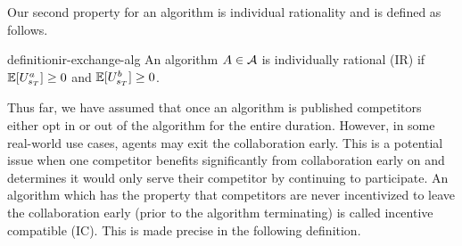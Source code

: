 
Our second property for an algorithm is individual rationality and is defined as follows.

\begin{restatable}{definition}{ir-exchange-alg}
    An algorithm $A\in\mathcal{A}$ is individually rational (IR) if 
    $\mathbb{E}[U^a_{ s_{T}
            }] \geq 0$
    and
    $\mathbb{E}[U^b_{ s_{T}
            }] \geq 0$.
\end{restatable}  


Thus far, we have assumed that once an algorithm is published competitors either opt in or out of the 
algorithm for the entire duration. However, in some real-world use cases, agents may exit the collaboration early. This is a potential issue when one competitor 
benefits significantly from collaboration early on and determines it would only serve their 
competitor by continuing to participate. An algorithm which has the property that competitors are 
never incentivized to leave the collaboration early (prior to the algorithm terminating) is
called incentive compatible (IC). This is made precise in the following definition.

